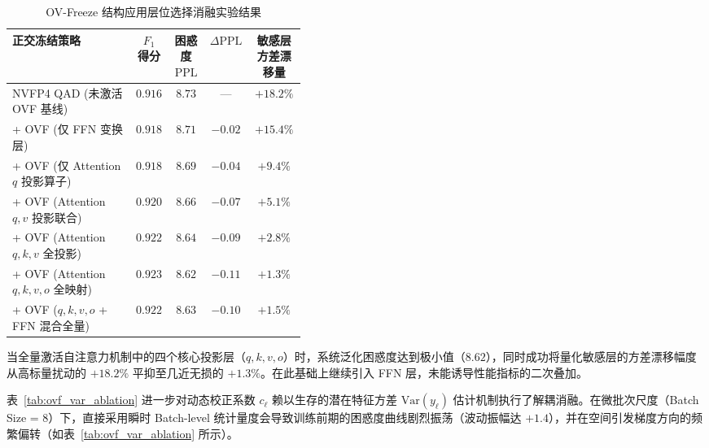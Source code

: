 \documentclass[11pt, a4paper]{article}
\begin{document}
\begin{table}[htbp]
\centering
\caption{OV-Freeze 结构应用层位选择消融实验结果}
\label{tab:ovf_layer_ablation}
\small
\renewcommand{\arraystretch}{1.15}
\begin{tabular}{>{\raggedright\arraybackslash}p{0.42\linewidth}cccc}
\toprule
\textbf{正交冻结策略} & \textbf{$F_1$ 得分} & \textbf{困惑度 $\mathrm{PPL}$} & \textbf{$\Delta\mathrm{PPL}$} & \textbf{敏感层方差漂移量} \\
\midrule
NVFP4 QAD (未激活 OVF 基线) & $0.916$ & $8.73$ & — & $+18.2\%$ \\
+ OVF (仅 FFN 变换层) & $0.918$ & $8.71$ & $-0.02$ & $+15.4\%$ \\
+ OVF (仅 Attention $q$ 投影算子) & $0.918$ & $8.69$ & $-0.04$ & $+9.4\%$ \\
+ OVF (Attention $q, v$ 投影联合) & $0.920$ & $8.66$ & $-0.07$ & $+5.1\%$ \\
+ OVF (Attention $q, k, v$ 全投影) & $0.922$ & $8.64$ & $-0.09$ & $+2.8\%$ \\
+ OVF (Attention $q, k, v, o$ 全映射) & $\mathbf{0.923}$ & $\mathbf{8.62}$ & $\mathbf{-0.11}$ & $\mathbf{+1.3\%}$ \\
+ OVF ($q, k, v, o$ + FFN 混合全量) & $0.922$ & $8.63$ & $-0.10$ & $+1.5\%$ \\
\bottomrule
\end{tabular}
\end{table}

当全量激活自注意力机制中的四个核心投影层（$q, k, v, o$）时，系统泛化困惑度达到极小值（$8.62$），同时成功将量化敏感层的方差漂移幅度从高标量扰动的 $+18.2\%$ 平抑至几近无损的 $+1.3\%$。在此基础上继续引入 FFN 层，未能诱导性能指标的二次叠加。

表~\ref{tab:ovf_var_ablation} 进一步对动态校正系数 $c_\ell$ 赖以生存的潜在特征方差 $\text{Var}(y_\ell)$ 估计机制执行了解耦消融。在微批次尺度（Batch Size = 8）下，直接采用瞬时 Batch-level 统计量度会导致训练前期的困惑度曲线剧烈振荡（波动振幅达 $+1.4$），并在空间引发梯度方向的频繁偏转（如表~\ref{tab:ovf_var_ablation} 所示）。
\end{document}

